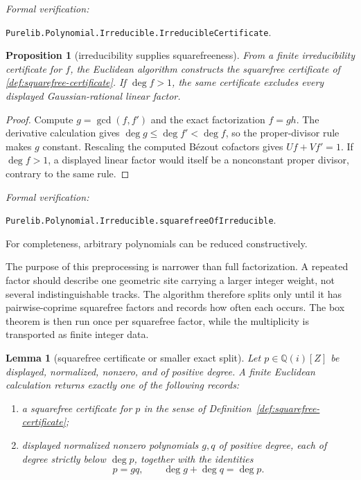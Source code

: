 \documentclass[11pt]{article}
\newtheorem{lemma}[theorem]{Lemma}
\newtheorem{proposition}[theorem]{Proposition}
\newcommand{\Qi}{\mathbb{Q}(i)}
\newcommand{\Defref}[1]{Definition~\ref{#1}}
\newcommand{\leanref}[1]{\par\smallskip\noindent
  \emph{Formal verification:}\par\nobreak
  {\raggedright\nolinkurl{#1}.\par}}
\begin{document}
\leanref{Purelib.Polynomial.Irreducible.IrreducibleCertificate}

\begin{proposition}[irreducibility supplies squarefreeness]
\label{prop:irreducible-squarefree}
From a finite irreducibility certificate for $f$, the Euclidean algorithm
constructs the squarefree certificate of
\cref{def:squarefree-certificate}.  If $\deg f>1$, the same certificate
excludes every displayed Gaussian-rational linear factor.
\end{proposition}

\begin{proof}
Compute $g=\gcd(f,f')$ and the exact factorization $f=gh$.  The derivative
calculation gives $\deg g\le\deg f'<\deg f$, so the proper-divisor rule makes
$g$ constant.  Rescaling the computed Bézout cofactors gives
$Uf+Vf'=1$.  If $\deg f>1$, a displayed linear factor would itself be a
nonconstant proper divisor, contrary to the same rule.
\end{proof}

\leanref{Purelib.Polynomial.Irreducible.squarefreeOfIrreducible}

For completeness, arbitrary polynomials can be reduced constructively.

The purpose of this preprocessing is narrower than full factorization.  A
repeated factor should describe one geometric site carrying a larger integer
weight, not several indistinguishable tracks.  The algorithm therefore splits
only until it has pairwise-coprime squarefree factors and records how often
each occurs.  The box theorem is then run once per squarefree factor, while
the multiplicity is transported as finite integer data.

\begin{lemma}[squarefree certificate or smaller exact split]
\label{lem:squarefree-or-split}
Let $p\in\Qi[Z]$ be displayed, normalized, nonzero, and of positive degree.
A finite Euclidean calculation returns exactly one of the following records:
\begin{enumerate}[label=(\roman*)]
\item a squarefree certificate for $p$ in the sense of
\Defref{def:squarefree-certificate};
\item displayed normalized nonzero polynomials $g,q$ of positive degree,
each of degree strictly below $\deg p$, together with the identities
\[
                 p=gq,
 \qquad
                 \deg g+\deg q=\deg p.
\]
\end{enumerate}
\end{lemma}
\end{document}
